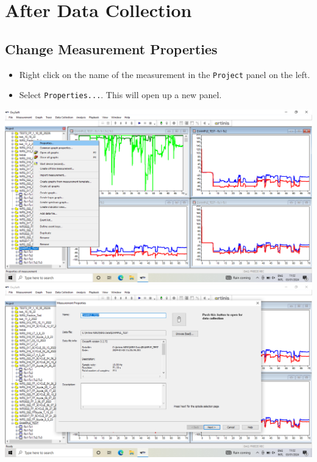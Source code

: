 \documentclass[
]{book}
\providecommand{\tightlist}{%
  \setlength{\itemsep}{0pt}\setlength{\parskip}{0pt}}
\begin{document}
\hypertarget{PortaMon-AfterDataCollection}{%
\section{After Data Collection}\label{PortaMon-AfterDataCollection}}

\hypertarget{PortaMon-ChangeProperties}{%
\subsection{Change Measurement Properties}\label{PortaMon-ChangeProperties}}

\begin{itemize}
\tightlist
\item
  Right click on the name of the measurement in the \texttt{Project} panel on the left.
\item
  Select \texttt{Properties...}. This will open up a new panel.
\end{itemize}

\includegraphics[width=1\linewidth]{images/changemeasurementproperties/select_measurement_properties}
\includegraphics[width=1\linewidth]{images/changemeasurementproperties/opened_measurement_properties}
\end{document}
